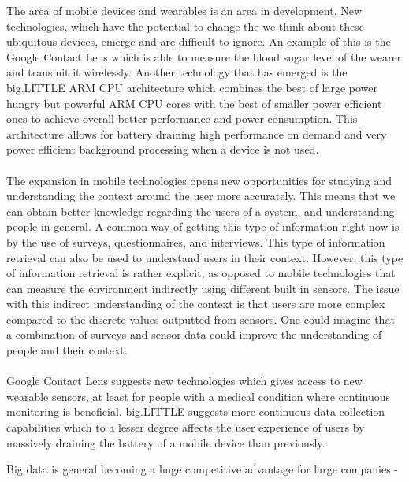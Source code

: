 The area of mobile devices and wearables is an area in development. New technologies, which have the potential to change the we think about these ubiquitous devices, emerge and are difficult to ignore. An example of this is the Google Contact Lens \parencite{google_contact_lens} which is able to measure the blood sugar level of the wearer and transmit it wirelessly. Another technology that has emerged is the big.LITTLE ARM CPU architecture \parencite{big_little_architecture} which combines the best of large power hungry but powerful ARM CPU cores with the best of smaller power efficient ones to achieve overall better performance and power consumption. This architecture allows for battery draining high performance on demand and very power efficient background processing when a device is not used. 
\\\\
The expansion in mobile technologies opens new opportunities for studying and understanding the context around the user more accurately. This means that we can obtain better knowledge regarding the users of a system, and understanding people in general. A common way of getting this type of information right now is by the use of surveys, questionnaires, and interviews. This type of information retrieval can also be used to understand users in their context. However, this type of information retrieval is rather explicit, as opposed to mobile technologies that can measure the environment indirectly using different built in sensors. The issue with this indirect understanding of the context is that users are more complex compared to the discrete values outputted from sensors. One could imagine that a combination of surveys and sensor data could improve the understanding of people and their context. 
\\\\
Google Contact Lens suggests new technologies which gives access to new wearable sensors, at least for people with a medical condition where continuous monitoring is beneficial. big.LITTLE suggests more continuous data collection capabilities which to a lesser degree affects the user experience of users by massively draining the battery of a mobile device than previously. 

Big data is general becoming a huge competitive advantage for large companies - \parencite{lavalle2011big}

